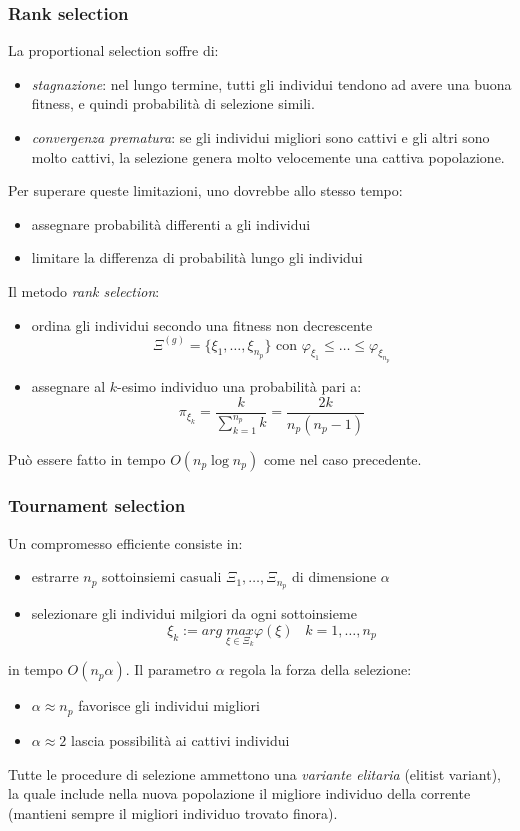 \documentclass{article}
\begin{document}
\subsubsection{Rank selection}
La proportional selection soffre di:
\begin{itemize}
    \item \textit{stagnazione}: nel lungo termine, tutti gli individui tendono ad
    avere una buona fitness, e quindi probabilità di selezione simili.
    \item \textit{convergenza prematura}: se gli individui migliori sono cattivi
    e gli altri sono molto cattivi, la selezione genera molto velocemente una
    cattiva popolazione.
\end{itemize}
Per superare queste limitazioni, uno dovrebbe allo stesso tempo:
\begin{itemize}
    \item assegnare probabilità differenti a gli individui
    \item limitare la differenza di probabilità lungo gli individui
\end{itemize}
Il metodo \textit{rank selection}:
\begin{itemize}
    \item ordina gli individui secondo una fitness non decrescente
    $$\Xi^{(g)}=\{\xi_1,\dots,\xi_{n_p}\}\text{ con }\varphi_{\xi_1}\leq\dots\leq\varphi_{\xi_{n_p}}$$
    \item assegnare al $k$-esimo individuo una probabilità pari a:
    $$\pi_{\xi_k}=\frac{k}{\sum_{k=1}^{n_p}k}=\frac{2k}{n_p(n_p-1)}$$
\end{itemize}
Può essere fatto in tempo $O(n_p \log n_p)$ come nel caso precedente.

\subsubsection{Tournament selection}
Un compromesso efficiente consiste in:
\begin{itemize}
    \item estrarre $n_p$ sottoinsiemi casuali $\Xi_1,\dots,\Xi_{n_p}$ di dimensione $\alpha$
    \item selezionare gli individui milgiori da ogni sottoinsieme
    $$\xi_k:=arg\;\underset{\xi\in\Xi_k}{max}\varphi(\xi)\;\;\;k=1,\dots,n_p$$
\end{itemize}

in tempo $O(n_p\alpha)$. Il parametro $\alpha$ regola la forza della selezione:
\begin{itemize}
    \item $\alpha\approx n_p$ favorisce gli individui migliori
    \item $\alpha\approx 2$ lascia possibilità ai cattivi individui
\end{itemize}
Tutte le procedure di selezione ammettono una \textit{variante elitaria} (elitist variant),
la quale include nella nuova popolazione il migliore individuo della corrente (mantieni
sempre il migliori individuo trovato finora).
\end{document}
